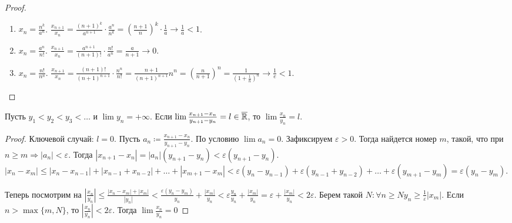 \begin{proof}
    \slashn
    \begin{enumerate}
        \item $x_n = \frac{n^k}{a^n}$. $\frac{x_{n+1}}{x_n} = \frac{(n+1)^k}{a^{n+1}} \cdot \frac{a^n}{n^k} = \left(\frac{n+1} {n}\right)^k \cdot \frac{1}{a} \to \frac{1}{a} < 1$.
        \item $x_n = \frac{a^n}{n!}$. $\frac{x_{n+1}}{x_n} = \frac{a^{n+1}}{(n+1)!} \cdot \frac{n!}{a^n} = \frac{a}{n+1} \to 0$.
        \item $x_n = \frac{n!}{n^n}$. $\frac{x_{n+1}}{x_n} = \frac{(n+1)!}{(n+1)^{n+1}} \cdot \frac{n^n}{n!} = \frac{n+1}{(n+1)^{n+1}} n^n = \left(\frac{n}{n+1}\right)^n = \frac{1}{\left(1+\frac{1}{n}\right)^n} \to \frac{1}{e} < 1$.
    \end{enumerate}
\end{proof}
\begin{theorem}
    Пусть $y_1 < y_2 < y_3 < \ldots$ и $\lim y_n = +\infty$. Если  $\lim \frac{x_{n+1}-x_n}{y_{n+1}-y_n} = l \in \overline{\mathbb{R}}$, то  $\lim \frac{x_n}{y_n} = l$.
\end{theorem}
\begin{proof}
    Ключевой случай: $l = 0$. Пусть  $a_n \coloneqq \frac{x_{n+1} - x_n}{y_{n+1} - y_n}$. По условию $\lim a_n = 0$. Зафиксируем  $\varepsilon > 0$. Тогда найдется номер  $m$, такой, что при $n \ge m \Rightarrow |a_n| < \varepsilon$. Тогда $|x_{n+1} -x_n| = |a_n|(y_{n+1} - y_n) < \varepsilon (y_{n+1} - y_n)$.  $|x_n - x_m| \le |x_n - x_{n-1}| + |x_{n-1} + x_{n-2}| + \ldots + |x_{m+1} - x_m| < \varepsilon(y_n - y_{n-1}) + \varepsilon(y_{n-1} + y_{n-2}) + \ldots + \varepsilon(y_{m+1} - y_m) = \varepsilon(y_n - y_m)$.

    Теперь посмотрим на $|\frac{x_n}{y_n}| \le \frac{|x_n -x_m| + |x_m|}{|y_n|} < \frac{\varepsilon(y_n - y_m)}{y_n} + \frac{|x_m|}{y_n} < \varepsilon \frac{y_n}{y_n} + \frac{|x_m|}{y_n} = \varepsilon + \frac{|x_m|}{y_n} < 2\varepsilon$. Берем такой $N: \forall n \ge N y_n \ge \frac{1}{\varepsilon}|x_m|$. Если $n > \max\{m, N\}$, то  $|\frac{x_n}{y_n}| < 2\varepsilon$. Тогда  $\lim \frac{x_n}{y_n} = 0$
\end{proof}
